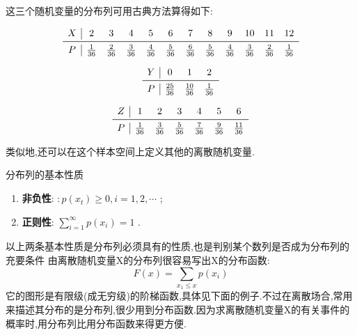 这三个随机变量的分布列可用古典方法算得如下:

\[
\begin{array}{c|ccccccccccc}
X     & 2     & 3     & 4     & 5     & 6     & 7 & 8 & 9 & 10 & 11 & 12 \\\midrule
P     &  \frac{1}{36}  &  \frac{2}{36}  &  \frac{3}{36}  &  \frac{4}{36}  &  \frac{5}{36}  &  \frac{6}{36}  &  \frac{5}{36}  &  \frac{4}{36}  &  \frac{3}{36}  &  \frac{2}{36}  &  \frac{1}{36}  \\
\end{array}
\]

\[
\begin{array}{c|ccc}
 Y  & 0     & 1     & 2 \\\midrule
 P  &  \frac{25}{36}  &  \frac{10}{36}  &  \frac{1}{36}  \\
\end{array}
\]	

\[
\begin{array}{c|cccccc}
 Z  & 1 & 2     & 3     & 4     & 5     & 6 \\\midrule
 P  &  \frac{1}{36}  &  \frac{3}{36}  &  \frac{5}{36}  &  \frac{7}{36}  &  \frac{9}{36}  &  \frac{11}{36}  \\
\end{array}
\]

类似地,还可以在这个样本空间上定义其他的离散随机变量.

分布列的基本性质

\begin{enumerate}
\item \textbf{非负性}: $ : p\left(x_{t}\right) \geqslant 0, i=1,2, \cdots $ ;
\item \textbf{正则性}: $ \sum_{i=1}^{\infty} p\left(x_{i}\right)=1 $ .
\end{enumerate}

以上两条基本性质是分布列必须具有的性质,也是判别某个数列是否成为分布列的充要条件
由离散随机变量X的分布列很容易写出X的分布函数:
\[ 
F(x)=\sum_{x_{1} \leqslant x} p\left(x_{i}\right)
\]
它的图形是有限级(成无穷级)的阶梯函数,具体见下面的例子.不过在离散场合,常用来描述其分布的是分布列,很少用到分布函数.因为求离散随机变量X的有关事件的概率时,用分布列比用分布函数来得更方便.


